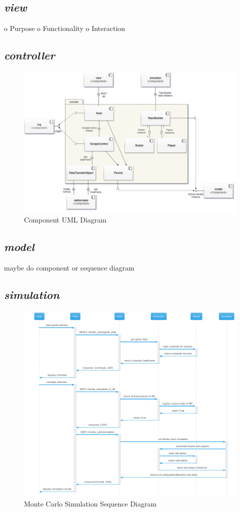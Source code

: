 \documentclass{thesis-ekf}
\theoremstyle{definition}
\theoremstyle{remark}
\begin{document}
\subsection{\emph{view}}
o	Purpose
o	Functionality
o	Interaction

\subsection{\emph{controller}}


\begin{figure}[th!]
	\centering
	\includegraphics[width=0.7\linewidth]{img/component/component_controller}
	\caption{Component UML Diagram}
	\label{img-controller-component}
\end{figure}


\subsection{\emph{model}}
maybe do component or sequence diagram

\subsection{\emph{simulation}}

\begin{figure}[th!]
	\centering
	\includegraphics[width=1\linewidth]{img/sequence/monte_carlo/monte_carlo_sequence_cerulean}
	\caption{Monte Carlo Simulation Sequence Diagram}
	\label{img-monte-carlo-sequence}
\end{figure}
\end{document}
